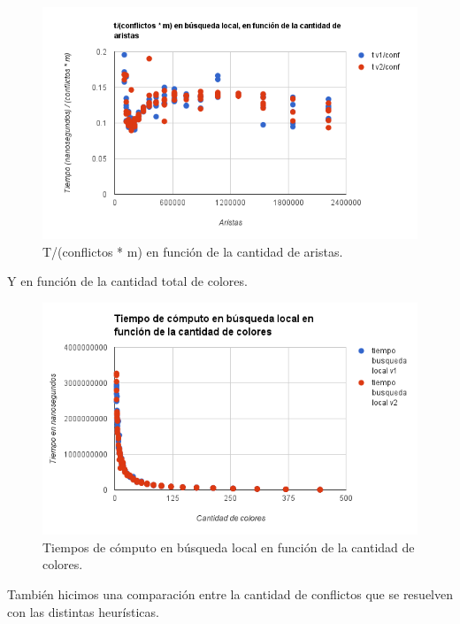   \begin{figure}[]
	\centering
 	\includegraphics[width=18cm]{imagenes/Ej4/TvsAristas3.png}
	\caption{T/(conflictos * m) en función de la cantidad de aristas.}
	\label{aristasEj4-3}
 \end{figure}
 
 Y en función de la cantidad total de colores.
 
  \begin{figure}[]
	\centering
 	\includegraphics[width=18cm]{imagenes/Ej4/TvsColores.png}
	\caption{Tiempos de cómputo en búsqueda local en función de la cantidad de colores.}
	\label{coloresEj4-2}
 \end{figure}
 
 También hicimos una comparación entre la cantidad de conflictos que se resuelven con las distintas heurísticas.
 
